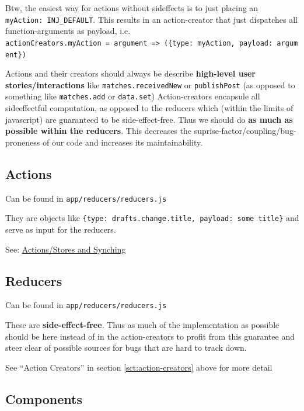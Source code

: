 Btw, the easiest way for actions without sideffects is to just placing
an \texttt{myAction:\ INJ\_DEFAULT}. This results in an action-creator
that just dispatches all function-arguments as payload, i.e.
\texttt{actionCreators.myAction\ =\ argument\ =\textgreater{}\ (\{type:\ \textquotesingle{}myAction\textquotesingle{},\ payload:\ argument\})}

Actions and their creators should always be describe \textbf{high-level user
stories/interactions} like \texttt{matches.receivedNew} or \texttt{publishPost}
(as opposed to something like \texttt{matches.add}
or \texttt{data.set})
Action-creators
encapsule all sideeffectful computation, as opposed to the reducers
which (within the limits of javascript) are guaranteed to be
side-effect-free. Thus we should do \textbf{as much as possible within
the reducers}. This decreases the suprise-factor/coupling/bug-proneness
of our code and increases its maintainability.

\subsection{Actions}\label{actions}

Can be found in \texttt{app/reducers/reducers.js} %

They are objects like
\texttt{\{type:\ \textquotesingle{}drafts.change.title\textquotesingle{},\ payload:\ \textquotesingle{}some\ title\textquotesingle{}\}}
and serve as input for the reducers.

See:
\href{https://github.com/researchstudio-sat/webofneeds/issues/342}{Actions/Stores
and Synching} %

\subsection{Reducers}\label{reducers}

Can be found in \texttt{app/reducers/reducers.js} %

These are \textbf{side-effect-free}. Thus as much of the implementation
as possible should be here instead of in the action-creators
to profit from this guarantee and steer clear of possible sources for
bugs that are hard to track down.

See ``Action Creators'' in section \ref{sct:action-creators} above for more detail

\subsection{Components}\label{components}

